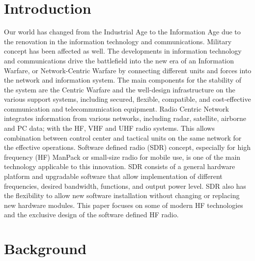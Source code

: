 \documentclass[conference]{IEEEtran}
\begin{document}
\section{Introduction}
Our world has changed from the Industrial Age to the Information Age due to the renovation in the information technology and communications. Military concept has been affected as well. The developments in information technology and communications drive the battlefield into the new era of an Information Warfare, or Network-Centric Warfare by connecting different units and forces into the network and information system. The main components for the stability of the system are the Centric Warfare and the well-design infrastructure on the various support systems, including secured, flexible, compatible, and cost-effective communication and telecommunication equipment. Radio Centric Network integrates information from various networks, including radar, satellite, airborne and PC data; with the HF, VHF and UHF radio systems. This allows combination between control center and tactical units on the same network for the effective operations. Software defined radio (SDR) concept, especially for high frequency (HF) ManPack or small-size radio for mobile use, is one of the main technology applicable to this innovation. SDR consists of a general hardware platform and upgradable software that allow implementation of different frequencies, desired bandwidth, functions, and output power level. SDR also has the flexibility to allow new software installation without changing or replacing new hardware modules. This paper focuses on some of modern HF technologies and the exclusive design of the software defined HF radio.
\section{Background}
\end{document}
